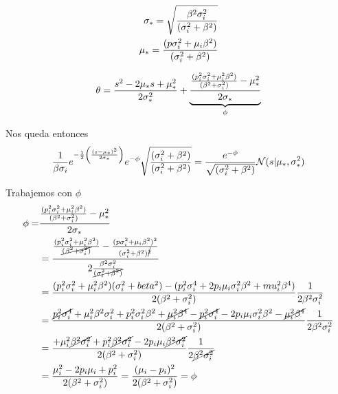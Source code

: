 \documentclass[11pt,twoside,spanish]{report} %
\begin{document}
\begin{equation}
	\centering
	\begin{split}
		\sigma_{\ast}=\sqrt{\frac{\beta^2\sigma_i^2}{(\sigma_i^2+\beta^2)}}\\
		\mu_{\ast}=\frac{(p\sigma_i^2+\mu_i\beta^2)}{(\sigma_i^2+\beta^2)}
	\end{split}
\end{equation}

\begin{equation}
	\centering
	\begin{split}
		\theta =\frac{s^2-2\mu_{\ast}s+\mu_{\ast}^2}{2\sigma_{\ast}^2} + \underbrace{\frac{\frac{(p_i^2\sigma_i^2+\mu_i^2\beta^2)}{(\beta^2+\sigma_i^2)}-\mu_{\ast}^2}{2\sigma_{\ast}}}_{\phi}
	\end{split}
\end{equation}

Nos queda entonces
\begin{equation}
	\centering
	\frac{1}{\beta\sigma_i}e^{-\frac{1}{2}\left( \frac{(s-\mu_{\ast})^2}{2\sigma_{\ast}}\right)}e^{-\phi}\sqrt{\frac{(\sigma_i^2+\beta^2)}{(\sigma_i^2+\beta^2)}}
	= \frac{e^{-\phi}}{\sqrt{(\sigma_i^2+\beta^2)}}\mathcal{N}(s \vert\mu_{\ast},\sigma_{\ast}^2)
\end{equation}

Trabajemos con $\phi$
\begin{equation}
	\centering
	\begin{split}
		\phi = & \frac{\frac{(p_i^2\sigma_i^2+\mu_i^2\beta^2)}{(\beta^2+\sigma_i^2)}-\mu_{\ast}^2}{2\sigma_{\ast}}\\
		& = \frac{\frac{(p_i^2\sigma_i^2+\mu_i^2\beta^2)}{\cancel{(\beta^2+\sigma_i^{2})}}-\frac{(p\sigma_i^2+\mu_i\beta^2)^2}{(\sigma_i^2+\beta^2)^{\cancel{2}}}}{2\frac{\beta^2\sigma_i^2}{\cancel{(\sigma_i^2+\beta^2)}}}\\
		& =\frac{(p_i^2\sigma_i^2+\mu_i^2\beta^2)(\sigma_i^2+beta^2)-(p_i^2\sigma_i^4+2p_i\mu_i\sigma_i^2\beta^2+mu_i^2\beta^4)}{2(\beta^2+\sigma_i^2)}\frac{1}{2\beta^2\sigma_i^2}\\
		& = \frac{\cancel{p_i^2\sigma_i^4}+\mu_i^2\beta^2\sigma_i^2+p_i^2\sigma_i^2\beta^2+\cancel{\mu_i^2\beta^4}-\cancel{p_i^2\sigma_i^4}-2p_i\mu_i\sigma_i^2\beta^2-\cancel{\mu_i^2\beta^4}}{2(\beta^2+\sigma_i^2)}\frac{1}{2\beta^2\sigma_i^2}\\
		& = \frac{+\mu_i^2\cancel{\beta^2\sigma_i^2}+p_i^2\cancel{\beta^2\sigma_i^2}-2p_i\mu_i\cancel{\beta^2\sigma_i^2}}{2(\beta^2+\sigma_i^2)}\frac{1}{2\cancel{\beta^2\sigma_i^2}}\\
		& = \frac{\mu_i^2-2p_i\mu_i+p_i^2}{2(\beta^2+\sigma_i^2)} = \frac{(\mu_i-p_i)^2}{2(\beta^2+\sigma_i^2)} = \phi
	\end{split}
\end{equation}
\end{document}
